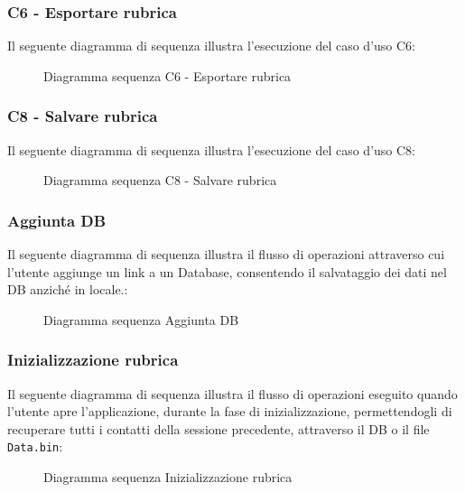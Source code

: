 \newpage
\subsubsection{C6 - Esportare rubrica}
Il seguente diagramma di sequenza illustra l'esecuzione del caso d'uso C6:

\begin{figure}[h]
	\caption{Diagramma sequenza C6 - Esportare rubrica}
	\label{fig:Diagramma sequenza C6 - Esportare rubrica}
\end{figure}

\newpage
\subsubsection{C8 - Salvare rubrica}
Il seguente diagramma di sequenza illustra l'esecuzione del caso d'uso C8:

\begin{figure}[h]
	\caption{Diagramma sequenza C8 - Salvare rubrica}
	\label{fig:Diagramma sequenza C8 - Salvare rubrica}
\end{figure}

\newpage
\subsubsection{Aggiunta DB}
Il seguente diagramma di sequenza illustra il flusso di operazioni attraverso cui l'utente aggiunge un link a un Database, consentendo il salvataggio dei dati nel DB anziché in locale.:

\begin{figure}[h]
	\caption{Diagramma sequenza Aggiunta DB}
	\label{fig:Diagramma sequenza Aggiunta DB}
\end{figure}

\newpage
\subsubsection{Inizializzazione rubrica}
Il seguente diagramma di sequenza illustra il flusso di operazioni eseguito quando l'utente apre l'applicazione, durante la fase di inizializzazione, permettendogli di recuperare tutti i contatti della sessione precedente, attraverso il DB o il file \texttt{Data.bin}:

\begin{figure}[h]
	\caption{Diagramma sequenza Inizializzazione rubrica}
	\label{fig:Diagramma sequenza Inizializzazione rubrica}
\end{figure}


